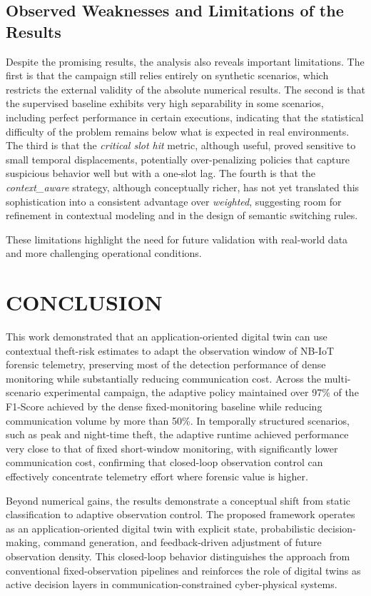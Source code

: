 \documentclass[journal]{IEEEtran}
\begin{document}
\subsection{Observed Weaknesses and Limitations of the Results}
Despite the promising results, the analysis also reveals important limitations. The first is that the campaign still relies entirely on synthetic scenarios, which restricts the external validity of the absolute numerical results. The second is that the supervised baseline exhibits very high separability in some scenarios, including perfect performance in certain executions, indicating that the statistical difficulty of the problem remains below what is expected in real environments. The third is that the \textit{critical slot hit} metric, although useful, proved sensitive to small temporal displacements, potentially over-penalizing policies that capture suspicious behavior well but with a one-slot lag. The fourth is that the \textit{context\_aware} strategy, although conceptually richer, has not yet translated this sophistication into a consistent advantage over \textit{weighted}, suggesting room for refinement in contextual modeling and in the design of semantic switching rules.

These limitations highlight the need for future validation with real-world data and more challenging operational conditions.

\section{CONCLUSION}  \label{sec:Conclusion}
This work demonstrated that an application-oriented digital twin can use contextual theft-risk estimates to adapt the observation window of NB-IoT forensic telemetry, preserving most of the detection performance of dense monitoring while substantially reducing communication cost. Across the multi-scenario experimental campaign, the adaptive policy maintained over 97\% of the F1-Score achieved by the dense fixed-monitoring baseline while reducing communication volume by more than 50\%. In temporally structured scenarios, such as peak and night-time theft, the adaptive runtime achieved performance very close to that of fixed short-window monitoring, with significantly lower communication cost, confirming that closed-loop observation control can effectively concentrate telemetry effort where forensic value is higher.

Beyond numerical gains, the results demonstrate a conceptual shift from static classification to adaptive observation control. The proposed framework operates as an application-oriented digital twin with explicit state, probabilistic decision-making, command generation, and feedback-driven adjustment of future observation density. This closed-loop behavior distinguishes the approach from conventional fixed-observation pipelines and reinforces the role of digital twins as active decision layers in communication-constrained cyber-physical systems.
\end{document}
